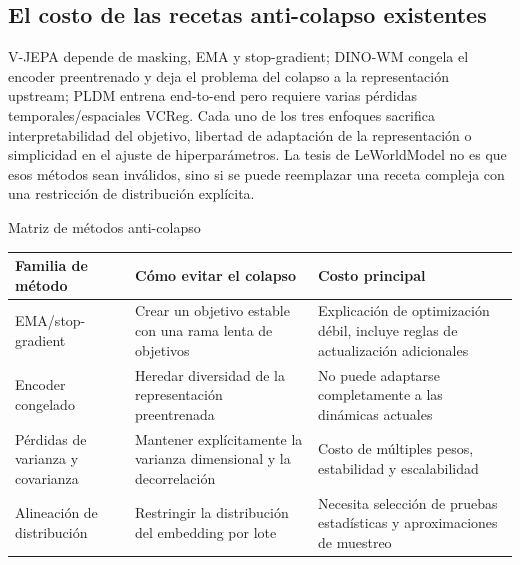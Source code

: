 \subsection{El costo de las recetas anti-colapso existentes}

V-JEPA depende de masking, EMA y stop-gradient; DINO-WM congela el encoder preentrenado y deja el problema del colapso a la representación upstream; PLDM entrena end-to-end pero requiere varias pérdidas temporales/espaciales VCReg. Cada uno de los tres enfoques sacrifica interpretabilidad del objetivo, libertad de adaptación de la representación o simplicidad en el ajuste de hiperparámetros. La tesis de LeWorldModel no es que esos métodos sean inválidos, sino si se puede reemplazar una receta compleja con una restricción de distribución explícita.



\begin{knowledgebox}{Matriz de métodos anti-colapso}
\begin{tabularx}{\textwidth}{L{0.19\textwidth} L{0.24\textwidth} X}
\toprule
Familia de método & Cómo evitar el colapso & Costo principal \\
\midrule
EMA/stop-gradient & Crear un objetivo estable con una rama lenta de objetivos & Explicación de optimización débil, incluye reglas de actualización adicionales \\
Encoder congelado & Heredar diversidad de la representación preentrenada & No puede adaptarse completamente a las dinámicas actuales \\
Pérdidas de varianza y covarianza & Mantener explícitamente la varianza dimensional y la decorrelación & Costo de múltiples pesos, estabilidad y escalabilidad \\
Alineación de distribución & Restringir la distribución del embedding por lote & Necesita selección de pruebas estadísticas y aproximaciones de muestreo \\
\bottomrule
\end{tabularx}
\end{knowledgebox}


